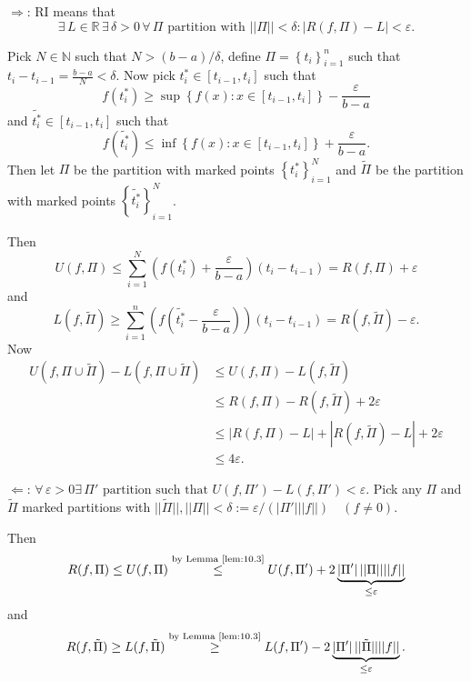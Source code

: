 \documentclass{notes}
\begin{document}
  \begin{prf}
    $\Rightarrow$: RI means that 
    \[
      \exists \, L \in \mathbb R \, \exists \, \delta > 0 \, \forall \, \Pi \text{ partition with $||\Pi|| < \delta$}: \left | R(f, \Pi) - L \right | < \varepsilon.
    \]
    
    Pick $N \in \mathbb N$ such that $N > (b - a) / \delta$, define $\Pi = \left \{ t_i \right \}_{i = 1}^n$ such that $t_i - t_{i - 1} = \frac{b - a}{N} < \delta$. 
    Now pick $t^*_i \in [t_{i - 1}, t_i]$ such that 
    \[
      f(t^*_i) \geq \sup \left \{ f(x) : x \in [t_{i - 1}, t_i] \right \} - \frac{\varepsilon}{b - a}
    \]
    and $\tilde{t^*_i} \in [t_{i - 1}, t_i]$ such that 
    \[
      f(\tilde{t^*_i}) \leq \inf \left \{ f(x) : x \in [t_{i - 1}, t_i] \right \} + \frac{\varepsilon}{b - a}.
    \]
    Then let $\Pi$ be the partition with marked points $\left \{ t^*_i \right \}_{i = 1}^N$ and $\tilde \Pi$ be the partition with marked points $\left \{ \tilde{t^*_i} \right \}_{i = 1}^N$.

    Then 
    \[
      U(f, \Pi) \leq \sum_{i = 1}^N \left ( f(t^*_i) + \frac{\varepsilon}{b - a} \right ) (t_i - t_{i - 1}) = R(f, \Pi) + \varepsilon
    \]
    and 
    \[
      L(f, \tilde \Pi) \geq \sum_{i = 1}^n \left ( f(\tilde{t^*_i} - \frac{\varepsilon}{b - a}) \right ) (t_i - t_{i - 1}) = R(f, \tilde \Pi) - \varepsilon.
    \]
    Now 
    \begin{align*}
      U(f, \Pi \cup \tilde \Pi) - L(f, \Pi \cup \tilde \Pi) &\leq U(f, \Pi) - L(f, \tilde \Pi) \\ 
      &\leq R(f, \Pi) - R(f, \tilde \Pi) + 2 \varepsilon \\ 
      &\leq \left | R(f, \Pi) - L \right | + \left | R(f, \tilde \Pi) - L \right | + 2 \varepsilon \\ 
      &\leq 4 \varepsilon.
    \end{align*}
    
    $\Leftarrow$: $\forall \, \varepsilon > 0 \exists \, \Pi' \text{ partition such that } U(f, \Pi') - L(f, \Pi') < \varepsilon$.
    Pick any $\Pi$ and $\tilde \Pi$ marked partitions with $||\tilde \Pi||, ||\Pi|| < \delta := \varepsilon / (\left | \Pi' \right | ||f||) \quad (f \neq 0)$.
    
    Then 
    \[
      R(f, \Pi) \leq U(f, \Pi) \overset{\text{by Lemma~\ref{lem:10.3}}}{\leq} U(f, \Pi') + 2 \underbrace{\left | \Pi' \right | ||\Pi|| ||f||}_{\leq \varepsilon}
    \]
    and 
    \[
      R(f, \tilde \Pi) \geq L(f, \tilde \Pi) \overset{\text{by Lemma~\ref{lem:10.3}}}{\geq} L(f, \Pi') - 2 \underbrace{\left | \Pi' \right | ||\tilde \Pi|| ||f||}_{\leq \varepsilon}.
    \]
    

\end{prf}
\end{document}
